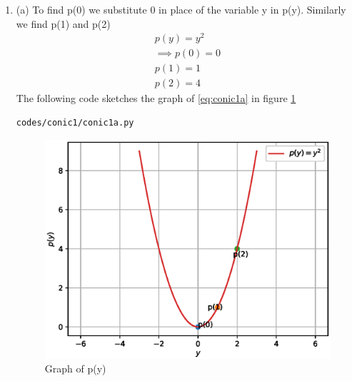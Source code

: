 \renewcommand{\theequation}{\theenumi}
\begin{enumerate}[label=\thesection.\arabic*.,ref=\thesection.\theenumi]

\item (a) To find p(0) we substitute 0 in place of the variable y in p(y). Similarly we find p(1) and p(2)
\begin{align}
\label{eq:conic1a}
 p(y) = y^{2}
\\
\implies p(0) =0
\\
p(1) = 1
\\
p(2) = 4
\end{align}
The following code sketches the graph of \ref{eq:conic1a} in figure \ref{fig:conic1a}
\begin{lstlisting}
codes/conic1/conic1a.py
\end{lstlisting}
\begin{figure}[!ht]
\centering
\includegraphics[width=\columnwidth]{./codes/conic1/pyfigs/conic1a.eps}
\caption{Graph of p(y)}
\label{fig:conic1a}
\end{figure}



\end{enumerate}
